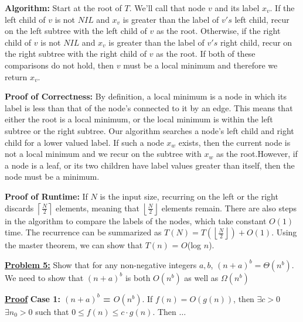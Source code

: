 \documentclass[11pt]{article}
\begin{document}
\begin{flushleft}
		\textbf{Algorithm:} Start at the root of $T$. We'll call that node $v$ and its label $x_v$. If the left child of $v$ is not $NIL$ and $x_v$ is greater than the label of $v's$ left child, recur on the left subtree with the left child of $v$ as the root. Otherwise, if the right child of $v$ is not $NIL$ and $x_v$ is greater than the label of $v's$ right child, recur on the right subtree with the right child of $v$ as the root. If both of these comparisons do not hold, then $v$ must be a local minimum and therefore we return $x_v$. 
		\newline
		
		\textbf{Proof of Correctness:} By definition, a local minimum is a node in which its label is less than that of the node's connected to it by an edge. This means that either the root is a local minimum, or the local minimum is within the left subtree or the right subtree. Our algorithm searches a node's left child and right child for a lower valued label. If such a node $x_w$ exists, then the current node is not a local minimum and we recur on the subtree with $x_w$ as the root.\newline However, if a node is a leaf, or its two children have label values greater than itself, then the node must be a minimum.
		\newpage
		
		\textbf{Proof of Runtime:} If $N$ is the input size, recurring on the left or the right discards $\left\lceil\frac{N}{2}\right\rceil$ elements, meaning that $\left\lfloor\frac{N}{2}\right\rfloor$ elements remain. There are also steps in the algorithm to compare the labels of the nodes, which take constant $O(1)$ time. The recurrence can be summarized as $T(N) = T(\left\lfloor\frac{N}{2}\right\rfloor) + O(1)$. Using the master theorem, we can show that $T(n)$ = $O$(log $n$).
		\vspace{0.2cm}
		
		\item \textbf {\underline{Problem 5:}} Show that for any non-negative integers $a,b$,
		$(n+a)^b = \Theta(n^b).$\newline
		We need to show that $(n+a)^b$ is both $O(n^b)$ as well as $\Omega(n^b)$
		
		\textbf{\underline{Proof}}\newline
		\textbf{Case 1: $(n+a)^b$ = $O(n^b)$}. \newline
		If $f(n) = O(g(n))$, then $\exists c > 0$ $\exists n_0 > 0$ such that 
		$0 \leq f(n) \leq c \cdot g(n)$. Then $\dots$
		
		\begin{center}
		\end{center}


\end{flushleft}
\end{document}
